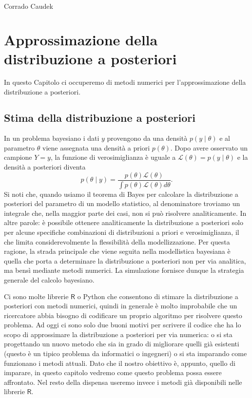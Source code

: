 \documentclass[
  10pt,
  italian,
  a4paper,
  extrafontsizes,onecolumn,openright
  ]{memoir}
\newcommand{\R}{\textsf{R}} %
\begin{document}
\bigskip

Corrado Caudek

\mainmatter

\hypertarget{metropolis}{%
\chapter{Approssimazione della distribuzione a posteriori}\label{metropolis}}

In questo Capitolo ci occuperemo di metodi numerici per l'approssimazione della distribuzione a posteriori.

\hypertarget{stima-della-distribuzione-a-posteriori}{%
\section{Stima della distribuzione a posteriori}\label{stima-della-distribuzione-a-posteriori}}

In un problema bayesiano i dati \(y\) provengono da una densità \(p(y \mid \theta)\) e al parametro \(\theta\) viene assegnata una densità a priori \(p(\theta)\). Dopo avere osservato un campione \(Y = y\), la funzione di verosimiglianza è uguale a \(\mathcal{L}(\theta) = p(y \mid \theta)\) e la densità a posteriori diventa
\begin{equation}
p(\theta \mid y) = \frac{p(\theta) \mathcal{L}(\theta)}{\int p(\theta) \mathcal{L}(\theta) d \theta}.
\end{equation}
Si noti che, quando usiamo il teorema di Bayes per calcolare la distribuzione a posteriori del parametro di un modello statistico, al denominatore troviamo un integrale
che, nella maggior parte dei casi, non si può risolvere analiticamente. In altre parole: è possibile ottenere analiticamente la distribuzione a posteriori solo per alcune specifiche combinazioni di distribuzioni a priori e verosimiglianza, il che limita considerevolmente la flessibilità della modellizzazione.
Per questa ragione, la strada principale che viene seguita nella modellistica bayesiana è quella che porta a determinare la distribuzione a posteriori non per via analitica, ma bensì mediante metodi numerici. La simulazione fornisce dunque la strategia generale del calcolo bayesiano.

Ci sono molte librerie \(\R\) o Python che consentono di stimare la distribuzione a posteriori con metodi numerici, quindi in generale è molto improbabile che un ricercatore abbia bisogno di codificare un proprio algoritmo per risolvere questo problema. Ad oggi ci sono solo due buoni motivi per scrivere il codice che ha lo scopo di approssimare la distribuzione a posteriori per via numerica: o si sta progettando un nuovo metodo che sia in grado di migliorare quelli già esistenti (questo è un tipico problema da informatici o ingegneri) o si sta imparando come funzionano i metodi attuali. Dato che il nostro obiettivo è, appunto, quello di imparare, in questo capitolo vedremo come questo problema possa essere affrontato. Nel resto della dispensa useremo invece i metodi già disponibili nelle librerie \(\R\).
\end{document}
